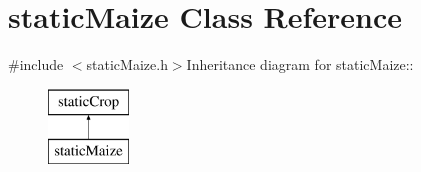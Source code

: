 \hypertarget{classstatic_maize}{
\section{staticMaize Class Reference}
\label{classstatic_maize}
}


{\ttfamily \#include $<$staticMaize.h$>$}Inheritance diagram for staticMaize::\begin{figure}[H]
\begin{center}
\leavevmode
\includegraphics[height=2cm]{classstatic_maize}
\end{center}
\end{figure}
